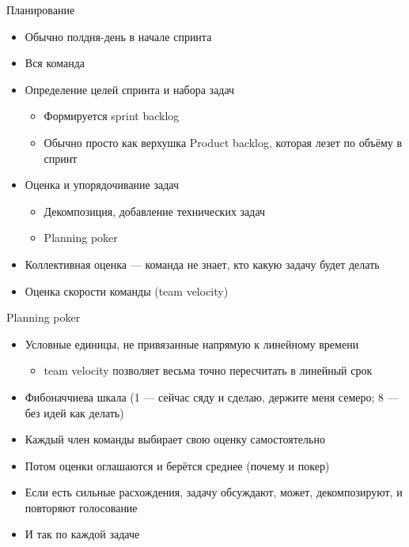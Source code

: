 \documentclass{../../slides-style}
\begin{document}
    \begin{frame}{Планирование}
        \begin{itemize}
            \item Обычно полдня-день в начале спринта
            \item Вся команда
            \item Определение целей спринта и набора задач
            \begin{itemize}
                \item Формируется sprint backlog
                \item Обычно просто как верхушка Product backlog, которая лезет по объёму в спринт
            \end{itemize}
            \item Оценка и упорядочивание задач
            \begin{itemize}
                \item Декомпозиция, добавление технических задач
                \item Planning poker
            \end{itemize}
            \item Коллективная оценка --- команда не знает, кто какую задачу будет делать
            \item Оценка скорости команды (team velocity)
        \end{itemize}
    \end{frame}

    \begin{frame}{Planning poker}
        \begin{itemize}
            \item Условные единицы, не привязанные напрямую к линейному времени
            \begin{itemize}
                \item team velocity позволяет весьма точно пересчитать в линейный срок
            \end{itemize}
            \item Фибоначчиева шкала (1 --- сейчас сяду и сделаю, держите меня семеро; 8 --- без идей как делать)
            \item Каждый член команды выбирает свою оценку самостоятельно
            \item Потом оценки оглашаются и берётся среднее (почему и покер)
            \item Если есть сильные расхождения, задачу обсуждают, может, декомпозируют, и повторяют голосование
            \item И так по каждой задаче
        \end{itemize}
    \end{frame}
\end{document}
